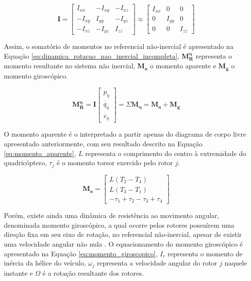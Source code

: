 \documentclass[main.tex]{subfiles}
\begin{document}
\begin{equation}\label{eq:tensor_inercia}
	\boldsymbol{I} = \begin{bmatrix}
		I_{xx} & -I_{xy} & -I_{xz}\\
		-I_{xy} &  I_{yy} & -I_{yz}\\
		-I_{xz} & -I_{yz} & I_{zz}
	\end{bmatrix} \approx \begin{bmatrix}
	I_{xx} 	& 0 		& 0\\
	0 		&  I_{yy} 	& 0\\
	0 		& 0 		& I_{zz}
	\end{bmatrix}
\end{equation}

Assim, o somatório de momentos no referencial não-inercial é apresentado na Equação \ref{eq:dinamica_rotacao_nao_inercial_incompleta}, $	\boldsymbol{M^\eta_R}$ representa o momento resultante no sistema não inercial, $\boldsymbol{M_a}$ o momento aparente e $\boldsymbol{M_g}$ o momento giroscópico.

\begin{equation}\label{eq:dinamica_rotacao_nao_inercial_incompleta}
	\boldsymbol{M^\eta_R} = \boldsymbol{I} \begin{bmatrix}
		\dot{p_\eta}\\
		\dot{q_\eta}\\
		\dot{r_\eta}
	\end{bmatrix} = \Sigma \boldsymbol{M_\eta} = \boldsymbol{M_a} + \boldsymbol{M_g}
\end{equation}

O momento aparente é o interpretado a partir apenas do diagrama de corpo livre apresentado anteriormente, com seu resultado descrito na Equação \ref{eq:momento_aparente}, $L$ representa o comprimento do centro à extremidade do quadricóptero, $\tau_j$ é o momento torsor exercido pelo rotor $j$.

\begin{equation}\label{eq:momento_aparente}
	\boldsymbol{M_a} =
	\begin{bmatrix}
		L (T_2 - T_4)\\
		L (T_3 - T_1)\\
		-\tau_1 + \tau_2 - \tau_3 + \tau_4
	\end{bmatrix}
\end{equation}

Porém, existe ainda uma dinâmica de resistência ao movimento angular, denominada momento giroscópico, a qual ocorre pelos rotores possuírem uma direção fixa em seu eixo de rotação, no referencial não-inercial, apesar de existir uma velocidade angular não nula \cite{hibbeler2011engineering}. O equacionamento do momento giroscópico é apresentado na Equação \ref{eq:momento_giroscopico}, $I_r$ representa o momento de inércia da hélice do veículo, $\omega_j$ representa a velocidade angular do rotor $j$ naquele instante e $\Omega$ é a rotação resultante dos rotores.
\end{document}
